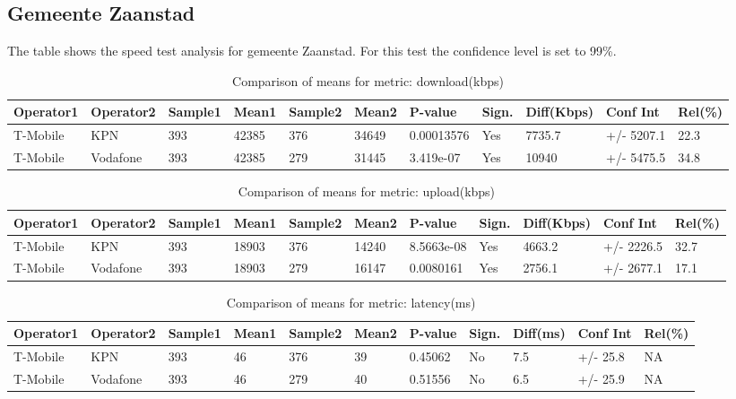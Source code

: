 \documentclass[]{article}
\begin{document}
\normalsize

\newpage

\subsection{Gemeente Zaanstad}\label{gemeente-zaanstad}

The table shows the speed test analysis for gemeente Zaanstad. For this
test the confidence level is set to 99\%.

\begin{table}[ht]
\centering
{\footnotesize
\begin{tabular}{lllllllllll}
  \hline
Operator1 & Operator2 & Sample1 & Mean1 & Sample2 & Mean2 & P-value & Sign. & Diff(Kbps) & Conf Int & Rel(\%) \\ 
  \hline
T-Mobile & KPN & 393 & 42385 & 376 & 34649 & 0.00013576 & Yes & 7735.7 & +/- 5207.1 & 22.3 \\ 
  T-Mobile & Vodafone & 393 & 42385 & 279 & 31445 & 3.419e-07 & Yes & 10940 & +/- 5475.5 & 34.8 \\ 
   \hline
\end{tabular}
}
\caption{Comparison of means for metric: download(kbps)} 
\end{table}\begin{table}[ht]
\centering
{\footnotesize
\begin{tabular}{lllllllllll}
  \hline
Operator1 & Operator2 & Sample1 & Mean1 & Sample2 & Mean2 & P-value & Sign. & Diff(Kbps) & Conf Int & Rel(\%) \\ 
  \hline
T-Mobile & KPN & 393 & 18903 & 376 & 14240 & 8.5663e-08 & Yes & 4663.2 & +/- 2226.5 & 32.7 \\ 
  T-Mobile & Vodafone & 393 & 18903 & 279 & 16147 & 0.0080161 & Yes & 2756.1 & +/- 2677.1 & 17.1 \\ 
   \hline
\end{tabular}
}
\caption{Comparison of means for metric: upload(kbps)} 
\end{table}\begin{table}[ht]
\centering
{\footnotesize
\begin{tabular}{lllllllllll}
  \hline
Operator1 & Operator2 & Sample1 & Mean1 & Sample2 & Mean2 & P-value & Sign. & Diff(ms) & Conf Int & Rel(\%) \\ 
  \hline
T-Mobile & KPN & 393 & 46 & 376 & 39 & 0.45062 & No & 7.5 & +/- 25.8 & NA \\ 
  T-Mobile & Vodafone & 393 & 46 & 279 & 40 & 0.51556 & No & 6.5 & +/- 25.9 & NA \\ 
   \hline
\end{tabular}
}
\caption{Comparison of means for metric: latency(ms)} 
\end{table}
\end{document}
